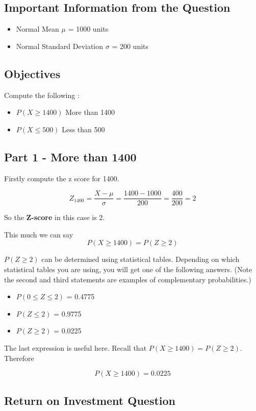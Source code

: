 \documentclass[12pts]{article}
\begin{document}
\subsection*{Important Information from the Question}
\begin{itemize}
\item Normal Mean $\mu$ = 1000 units
\item Normal Standard Deviation $\sigma$ = 200 units 
\end{itemize}

\subsection*{Objectives}
Compute the following : 
\begin{itemize}
\item $P(X \geq 1400 )$ More than 1400
\item $P(X \leq 500)$ Less than 500
\end{itemize}


\subsection*{Part 1 -  More than 1400}

Firstly compute the z score for 1400.

\[ Z_{1400} =  \frac{X - \mu}{\sigma} = \frac{1400 - 1000}{200} = \frac{400}{200} = 2  \]

So the \textbf{Z-score} in this case is 2.

This much we can say
\[P(X \geq 1400) = P(Z \geq 2)\]

$P(Z \geq 2)$ can be determined using statistical tables.
Depending on which statistical tables you are using, you will get one of the following answers. (Note the 
second and third statements are examples of complementary probabilities.)
\begin{itemize}
\item $P (0 \leq Z \leq 2)$ = 0.4775
\item $P ( Z \leq 2)$ = 0.9775
\item $P ( Z \geq 2)$ = 0.0225
\end{itemize}
The last expression is useful here. Recall that $P(X \geq 1400) = P(Z \geq 2)$. Therefore

\[P(X \geq 1400) = 0.0225\]

\subsection*{Return on Investment Question}
\end{document}
